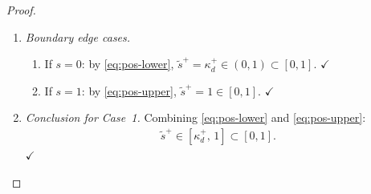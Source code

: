 \documentclass[12pt,openany]{book}
\numberwithin{equation}{chapter}
\theoremstyle{plain}
\theoremstyle{definition}
\theoremstyle{remark}
\begin{document}
\begin{proof}
\begin{enumerate}
\begin{align}
    \end{align}
  \item \emph{Boundary edge cases.}
    \begin{enumerate}
      \item If $s = 0$: by \eqref{eq:pos-lower},
        $\tilde{s}^{+} = \kappa_d^{+} \in (0,1) \subset [0,1]$.
        $\checkmark$
      \item If $s = 1$: by \eqref{eq:pos-upper},
        $\tilde{s}^{+} = 1 \in [0,1]$.  $\checkmark$
    \end{enumerate}
  \item \emph{Conclusion for Case~1.}
    Combining \eqref{eq:pos-lower} and \eqref{eq:pos-upper}:
    \begin{align}
      \tilde{s}^{+} \in [\kappa_d^{+},\,1] \subset [0,1].
      \label{eq:pos-conclusion}
    \end{align}
    $\checkmark$
\end{enumerate}


\end{proof}
\end{document}
